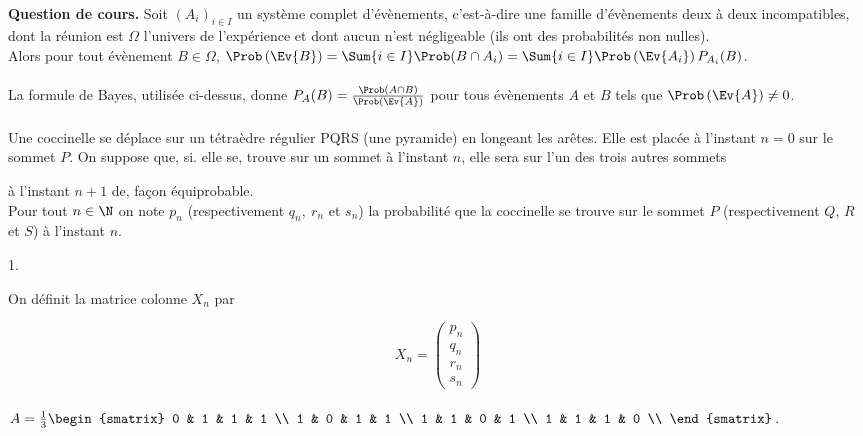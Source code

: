 \documentclass[11pt]{article}%
\begin{document}
 \begin{exercice} \indent \\
 \textbf{Question de cours.} Soit $(A_{i})_{i \in I}$ un système
complet d'évènements, c'est-à-dire une famille d'évènements deux à deux
incompatibles, dont la réunion est $\Omega$ l'univers de l'expérience
et dont aucun n'est négligeable (ils ont des probabilités non nulles).
\\
 Alors pour tout évènement $B \in \Omega$, $\Prob\left(\Ev{B}\right) =
\Sum{i \in I} \Prob( B \cap A_{i}) = \Sum{i \in I}
\Prob\left(\Ev{A_{i}}\right) P_{A_{i}} (B)$.
 \\
\\
 La formule de Bayes, utilisée ci-dessus, donne $P_{A}(B) = \frac{
\Prob( A \cap B) }{\Prob\left(\Ev{A}\right)}$ pour tous évènements $A$
et $B$ tels que $\Prob\left(\Ev{A}\right) \neq 0$. \\
\\
 Une coccinelle se déplace sur un tétraèdre régulier PQRS
 (une pyramide) en longeant les arêtes. Elle est placée à
 l'instant $n = 0$ sur le sommet $P$. On suppose que, si. elle se,
trouve sur
 un sommet à l'instant $n$, elle sera sur l'un des trois autres sommets

 à l'instant $n + 1$ de, façon équiprobable.
 \\
 Pour tout $n\in \N$ on note $p_{n}$ (respectivement $q_{n},\ r_{n}$ et
$s_{n}$) la probabilité que la coccinelle se trouve sur le sommet $P$
 (respectivement $Q$, $R$ et $S$) à l'instant $n$.

 \begin{noliste}{1.}
 \setlength{\itemsep}{4mm}
 \item On définit la matrice colonne $X_{n}$ par 


 
\[
 X_{n} = \left( 
\begin{array}{c}
 p_{n} \\
 q_{n} \\
 r_{n} \\
 s_{n}
\end{array}
\right) 
\]
 \\
 $A = \frac{1}{3} \begin{smatrix}
0 & 1 & 1 & 1 \\
1 & 0 & 1 & 1 \\
1 & 1 & 0 & 1 \\
1 & 1 & 1 & 0 \\
\end{smatrix}
$. \\



\end{noliste}
\end{exercice}
\end{document}
